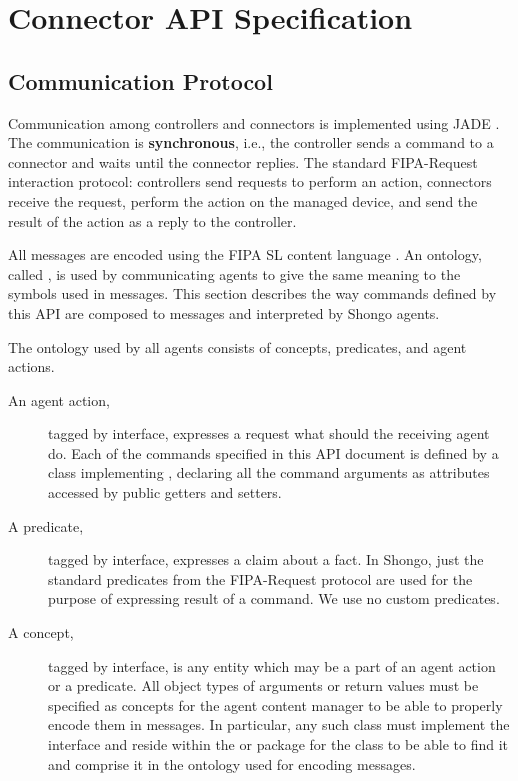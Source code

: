 \chapter{Connector API Specification}



\section{Communication Protocol}


Communication among controllers and connectors is implemented using JADE \cite{jade}. The communication is \textbf{synchronous}, i.e., the controller sends a command to a connector and waits until the connector replies. The standard FIPA-Request \cite{FIPA-Request} interaction protocol: controllers send requests to perform an action, connectors receive the request, perform the action on the managed device, and send the result of the action as a reply to the controller.

All messages are encoded using the FIPA SL content language \cite{FIPA-SL}. An ontology, called , is used by communicating agents to give the same meaning to the symbols used in messages. This section describes the way commands defined by this API are composed to messages and interpreted by Shongo agents.

The ontology used by all agents consists of concepts, predicates, and agent actions.
\begin{description}
\item[An agent action,] tagged by  interface, expresses a request what should the receiving agent do. Each of the commands specified in this API document is defined by a class implementing , declaring all the command arguments as attributes accessed by public getters and setters.
\item[A predicate,] tagged by  interface, expresses a claim about a fact. In Shongo, just the standard predicates from the FIPA-Request protocol are used for the purpose of expressing result of a command. We use no custom predicates.
\item[A concept,] tagged by  interface, is any entity which may be a part of an agent action or a predicate. All object types of arguments or return values must be specified as concepts for the agent content manager to be able to properly encode them in messages. In particular, any such class must implement the  interface and reside within the  or  package for the  class to be able to find it and comprise it in the ontology used for encoding messages.
\end{description}


